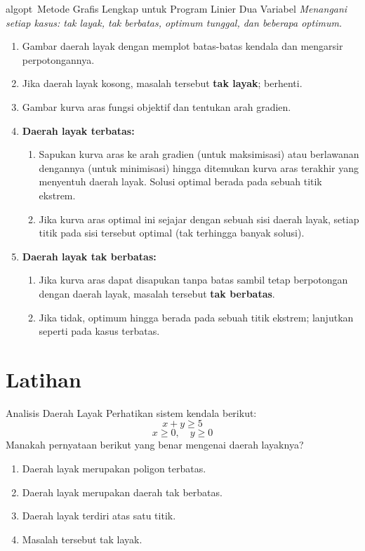 \begin{stepbox}{algopt}{\ Metode Grafis Lengkap untuk Program Linier Dua Variabel}
\emph{Menangani setiap kasus: tak layak, tak berbatas, optimum tunggal, dan beberapa optimum.}
\begin{enumerate}
    \item Gambar daerah layak dengan memplot batas-batas kendala dan mengarsir perpotongannya.
    \item Jika daerah layak kosong, masalah tersebut \textbf{tak layak}; berhenti.
    \item Gambar kurva aras fungsi objektif dan tentukan arah gradien.
    \item \textbf{Daerah layak terbatas:}
    \begin{enumerate}
        \item Sapukan kurva aras ke arah gradien (untuk maksimisasi) atau berlawanan dengannya (untuk minimisasi) hingga ditemukan kurva aras terakhir yang menyentuh daerah layak. Solusi optimal berada pada sebuah titik ekstrem.
        \item Jika kurva aras optimal ini sejajar dengan sebuah sisi daerah layak, setiap titik pada sisi tersebut optimal (tak terhingga banyak solusi).
    \end{enumerate}
    \item \textbf{Daerah layak tak berbatas:}
    \begin{enumerate}
        \item Jika kurva aras dapat disapukan tanpa batas sambil tetap berpotongan dengan daerah layak, masalah tersebut \textbf{tak berbatas}.
        \item Jika tidak, optimum hingga berada pada sebuah titik ekstrem; lanjutkan seperti pada kasus terbatas.
    \end{enumerate}
\end{enumerate}
\end{stepbox}

\newpage

\section{Latihan}\label{exercises}


\begin{ex}{Analisis Daerah Layak}{}
Perhatikan sistem kendala berikut:
\[
x + y \geq 5
\]
\[
x \geq 0, \quad y \geq 0
\]
Manakah pernyataan berikut yang benar mengenai daerah layaknya?
\begin{enumerate}
    \item Daerah layak merupakan poligon terbatas.
    \item Daerah layak merupakan daerah tak berbatas.
    \item Daerah layak terdiri atas satu titik.
    \item Masalah tersebut tak layak.
\end{enumerate}
\exrefs{\S\ref{sec:nonempty-bounded}, \S\ref{sec:unbounded-regions}}
\end{ex}

